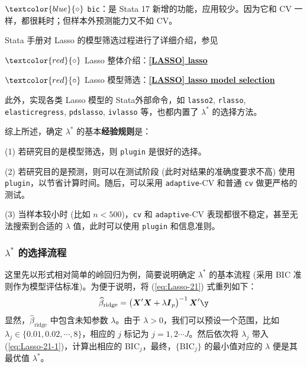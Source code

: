 $\textcolor{blue}{\circ}$ \texttt{bic}：是 Stata 17 新增的功能，应用较少。因为它和 CV 一样，都很耗时；但样本外预测能力又不如 CV。

Stata 手册对 Lasso 的模型筛选过程进行了详细介绍，参见 

$\textcolor{red}{\circ}$ Lasso 整体介绍：\href{https://www.stata.com/manuals/lassolasso.pdf}{\bfseries{[\MakeUppercase{lasso}] lasso}}

$\textcolor{red}{\circ}$ Lasso 模型筛选：\href{https://www.stata.com/manuals/lassolasso.pdf}{\bfseries{[\MakeUppercase{lasso}] lasso model selection}}

此外，实现各类 Lasso 模型的 Stata外部命令，如 \texttt{lasso2}, \texttt{rlasso}, \texttt{elasticregress}, \texttt{pdslasso}, \texttt{ivlasso} 等，也都内置了 $\lambda^*$ 的选择方法。 

\vspace{5pt}
综上所述，确定 $\lambda^{*}$ 的基本\textbf{经验规则}是：
\vspace{5pt}

(1) 若研究目的是模型筛选，则 \texttt{plugin} 是很好的选择。

(2) 若研究目的是预测，则可以在测试阶段 (此时对结果的准确度要求不高) 使用 \texttt{plugin}，以节省计算时间。随后，可以采用 \texttt{adaptive}-CV 和普通 \texttt{cv} 做更严格的测试。

(3) 当样本较小时 (比如 $n<500$)，\texttt{cv} 和 \texttt{adaptive}-CV 表现都很不稳定，甚至无法搜索到合适的 $\lambda$ 值，此时可以使用 \texttt{plugin} 和信息准则。

\subsubsection{$\lambda^*$ 的选择流程}

这里先以形式相对简单的岭回归为例，简要说明确定  $\lambda^*$ 的基本流程 (采用 BIC 准则作为模型评估标准)。为便于说明，将
(\ref{eq:Lasso-21}) 式重列如下：
\begin{equation}\label{eq:Lasso-21-1}
	\widehat{\beta}_{\text {ridge}} =\left(\boldsymbol{X}^{\prime} \boldsymbol{X}+\lambda \boldsymbol{I}_{p}\right)^{-1} \boldsymbol{X}^{\prime} \boldsymbol{\y}
\end{equation}
显然，$\widehat{\beta}_{\text {ridge}}$ 中包含未知参数 $\lambda$。由于 $\lambda>0$，我们可以预设一个范围，比如 $\lambda_j \in \{0.01, 0.02, \cdots, 8\}$，相应的 $j$ 标记为 $j=1,2\cdots J$。然后依次将 $\lambda_j$ 带入 (\ref{eq:Lasso-21-1})，计算出相应的 BIC$_j$，最终，$\{\mathrm{BIC}_j\}$ 的最小值对应的 $\lambda$ 便是其最优值 $\lambda^*$。

